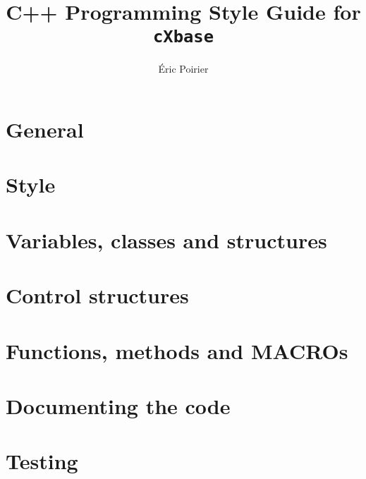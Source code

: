 \documentclass{report}
\newcommand{\files}{./files/}
\begin{document}
\title{C++ Programming Style Guide for \texttt{cXbase}}
\author{Éric Poirier}
\maketitle





\chapter{General}                              
\chapter{Style}                                
\chapter{Variables, classes and structures}    
\chapter{Control structures}                   
\chapter{Functions, methods and MACROs}        
\chapter{Documenting the code}                 
\chapter{Testing}                              
\end{document}

